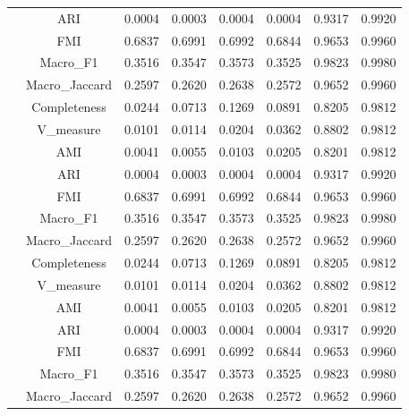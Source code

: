 \begin{table}[ht!]
\begin{tabular*}{\linewidth}{@{} lc c c c c c c @{}}
 & ARI  & 0.0004 & 0.0003 & 0.0004 & 0.0004 & 0.9317 & 0.9920 \\

 & FMI  & 0.6837 & 0.6991 & 0.6992 & 0.6844 & 0.9653 & 0.9960 \\

 & Macro_F1  & 0.3516 & 0.3547 & 0.3573 & 0.3525 & 0.9823 & 0.9980 \\

 & Macro_Jaccard  & 0.2597 & 0.2620 & 0.2638 & 0.2572 & 0.9652 & 0.9960 \\

 & Completeness  & 0.0244 & 0.0713 & 0.1269 & 0.0891 & 0.8205 & 0.9812 \\

 & V_measure  & 0.0101 & 0.0114 & 0.0204 & 0.0362 & 0.8802 & 0.9812 \\
\addlinespace
\multirow{7}{*}{IZGC}
 & AMI  & 0.0041 & 0.0055 & 0.0103 & 0.0205 & 0.8201 & 0.9812 \\

 & ARI  & 0.0004 & 0.0003 & 0.0004 & 0.0004 & 0.9317 & 0.9920 \\

 & FMI  & 0.6837 & 0.6991 & 0.6992 & 0.6844 & 0.9653 & 0.9960 \\

 & Macro_F1  & 0.3516 & 0.3547 & 0.3573 & 0.3525 & 0.9823 & 0.9980 \\

 & Macro_Jaccard  & 0.2597 & 0.2620 & 0.2638 & 0.2572 & 0.9652 & 0.9960 \\

 & Completeness  & 0.0244 & 0.0713 & 0.1269 & 0.0891 & 0.8205 & 0.9812 \\

 & V_measure  & 0.0101 & 0.0114 & 0.0204 & 0.0362 & 0.8802 & 0.9812 \\
\addlinespace
\multirow{7}{*}{IZGC}
 & AMI  & 0.0041 & 0.0055 & 0.0103 & 0.0205 & 0.8201 & 0.9812 \\

 & ARI  & 0.0004 & 0.0003 & 0.0004 & 0.0004 & 0.9317 & 0.9920 \\

 & FMI  & 0.6837 & 0.6991 & 0.6992 & 0.6844 & 0.9653 & 0.9960 \\

 & Macro_F1  & 0.3516 & 0.3547 & 0.3573 & 0.3525 & 0.9823 & 0.9980 \\

 & Macro_Jaccard  & 0.2597 & 0.2620 & 0.2638 & 0.2572 & 0.9652 & 0.9960 \\


\end{tabular*}
\end{table}

